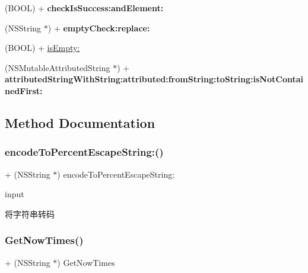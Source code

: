 \begin{DoxyCompactItemize}
(B\+O\+OL) + {\bfseries check\+Is\+Success\+:and\+Element\+:}
\item 
\mbox{\label{category_n_s_string_07_times_08_a4dcb22c54190c97c1321eba6c646db75}} 
(N\+S\+String $\ast$) + {\bfseries empty\+Check\+:replace\+:}
\item 
(B\+O\+OL) + \mbox{\hyperlink{category_n_s_string_07_times_08_a692968242e21fe4db53892537e563451}{is\+Empty\+:}}
\item 
\mbox{\label{category_n_s_string_07_times_08_a2fe89379dc40bd144a866c3dd9fc289d}} 
(N\+S\+Mutable\+Attributed\+String $\ast$) + {\bfseries attributed\+String\+With\+String\+:attributed\+:from\+String\+:to\+String\+:is\+Not\+Contained\+First\+:}
\end{DoxyCompactItemize}


\subsection{Method Documentation}
\mbox{\label{category_n_s_string_07_times_08_af55afa2034ba8702514b1d68c7c4f8db}} 
\subsubsection{\texorpdfstring{encode\+To\+Percent\+Escape\+String\+:()}{encodeToPercentEscapeString:()}}
{\footnotesize\ttfamily + (N\+S\+String $\ast$) encode\+To\+Percent\+Escape\+String\+: \begin{DoxyParamCaption}\item[{(N\+S\+String $\ast$)}]{input }\end{DoxyParamCaption}}

将字符串转码 \mbox{\label{category_n_s_string_07_times_08_a05f6ee23ca20fcc47f3187622a9e8bea}} 
\subsubsection{\texorpdfstring{Get\+Now\+Times()}{GetNowTimes()}}
{\footnotesize\ttfamily + (N\+S\+String $\ast$) Get\+Now\+Times \begin{DoxyParamCaption}{ }\end{DoxyParamCaption}}

